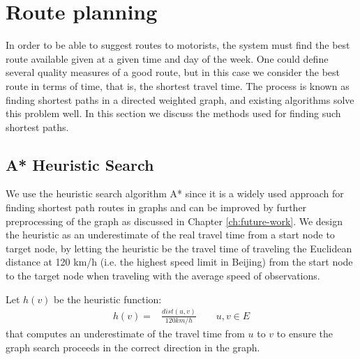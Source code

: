 \section{Route planning}
In order to be able to suggest routes to motorists, the system must find the best route available given at a given time and day of the week. One could define several quality measures of a good route, but in this case we consider the best route in terms of time, that is, the shortest travel time. The process is known as finding shortest paths in a directed weighted graph, and existing algorithms solve this problem well. In this section we discuss the methods used for finding such shortest paths.

\subsection{A* Heuristic Search}\label{sec:pathfinding}
We use the heuristic search algorithm A* since it is a widely used approach for finding shortest path routes in graphs and can be improved by further preprocessing of the graph as discussed in Chapter \ref{ch:future-work}.
We design the heuristic as an underestimate of the real travel time from a start node to target node, by letting the heuristic be the travel time of traveling the Euclidean distance at 120 km/h (i.e. the highest speed limit in Beijing) from the start node to the target node when traveling with the average speed of observations. 

Let $h(v)$ be the heuristic function:
\begin{align*}
h(v) = &\frac{dist(u,v)}{120 km/h} \qquad u,v \in E
\end{align*}
that computes an underestimate of the travel time from $u$ to $v$ to ensure the graph search proceeds in the correct direction in the graph.

